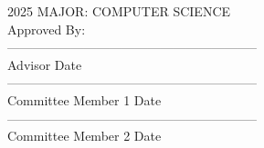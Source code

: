 \begin{flushleft}
    \vspace*{-0.20in}
    \hspace*{3.09in}2025 %
    \hspace*{3.09in}MAJOR: COMPUTER SCIENCE\\ %
    \hspace*{3.09in}Approved By:\\
    \hspace*{3.09in}-----------------------------------------------------------\\
    \vspace*{-0.25in}
    \hspace*{3.09in}Advisor\hspace*{1.5in} Date\hspace*{0.1in}\\
    \hspace*{3.09in}-----------------------------------------------------------\\
    \vspace*{-0.25in}
    \hspace*{3.09in}Committee Member 1\hspace*{0.48in} Date\hspace*{0.1in}\\
    \hspace*{3.09in}-----------------------------------------------------------\\
    \vspace*{-0.25in}
    \hspace*{3.09in}Committee Member 2\hspace*{0.48in} Date\hspace*{0.1in}\\
\end{flushleft}
